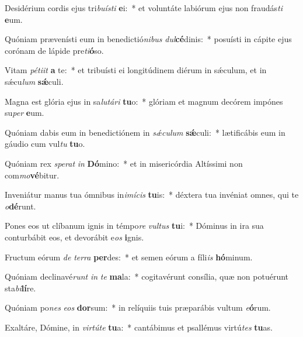 \item Desidérium cordis ejus tri\textit{bu}\textit{ís}\textit{ti} \textbf{e}i:~* et voluntáte labiórum ejus non fraudás\textit{ti} \textbf{e}um.
\item Quóniam prævenísti eum in benedictió\textit{ni}\textit{bus} \textit{dul}\textbf{cé}dinis:~* posuísti in cápite ejus corónam de lápide pre\textit{ti}\textbf{ó}so.
\item Vitam \textit{pé}\textit{ti}\textit{it} \textbf{a} te:~* et tribuísti ei longitúdinem diérum in sǽculum, et in sǽcu\textit{lum} \textbf{sǽ}culi.
\item Magna est glória ejus in sa\textit{lu}\textit{tá}\textit{ri} \textbf{tu}o:~* glóriam et magnum decórem impónes su\textit{per} \textbf{e}um.
\item Quóniam dabis eum in benedictiónem in \textit{sǽ}\textit{cu}\textit{lum} \textbf{sǽ}culi:~* lætificábis eum in gáudio cum vul\textit{tu} \textbf{tu}o.
\item Quóniam rex \textit{spe}\textit{rat} \textit{in} \textbf{Dó}mino:~* et in misericórdia Altíssimi non com\textit{mo}\textbf{vé}bitur.
\item Inveniátur manus tua ómnibus in\textit{i}\textit{mí}\textit{cis} \textbf{tu}is:~* déxtera tua invéniat omnes, qui te \textit{o}\textbf{dé}runt.
\item Pones eos ut clíbanum ignis in témpo\textit{re} \textit{vul}\textit{tus} \textbf{tu}i:~* Dóminus in ira sua conturbábit eos, et devorábit e\textit{os} \textbf{i}gnis.
\item Fructum eórum \textit{de} \textit{ter}\textit{ra} \textbf{per}des:~* et semen eórum a fíli\textit{is} \textbf{hó}minum.
\item Quóniam declinavé\textit{runt} \textit{in} \textit{te} \textbf{ma}la:~* cogitavérunt consília, quæ non potuérunt sta\textit{bi}\textbf{lí}re.
\item Quóniam po\textit{nes} \textit{e}\textit{os} \textbf{dor}sum:~* in relíquiis tuis præparábis vultum \textit{e}\textbf{ó}rum.
\item Exaltáre, Dómine, in \textit{vir}\textit{tú}\textit{te} \textbf{tu}a:~* cantábimus et psallémus virtú\textit{tes} \textbf{tu}as.
